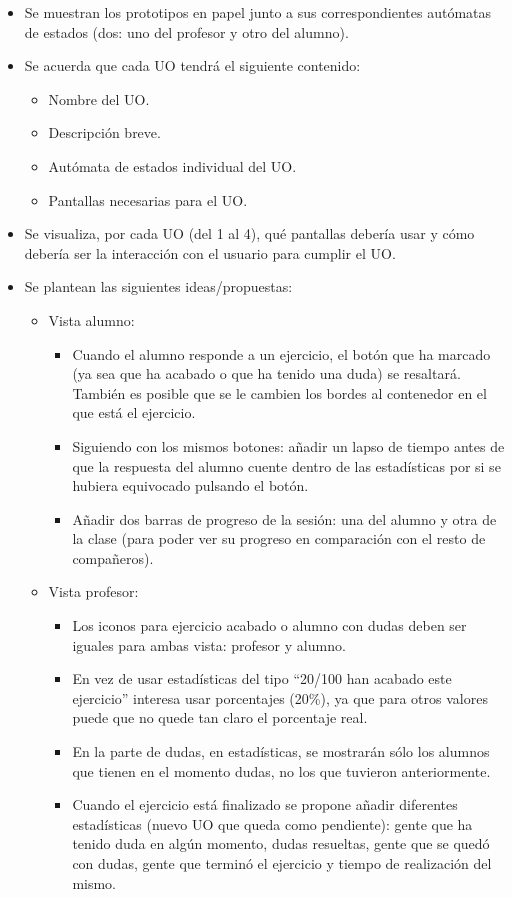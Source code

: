 \begin{itemize}
\item Se muestran los prototipos en papel junto a sus correspondientes autómatas de estados (dos: uno del profesor y otro del alumno).

\item Se acuerda que cada UO tendrá el siguiente contenido:
\begin{itemize}
	\item Nombre del UO.
	\item Descripción breve.
	\item Autómata de estados individual del UO.
	\item Pantallas necesarias para el UO.
\end{itemize}

\item Se visualiza, por cada UO (del 1 al 4), qué pantallas debería usar y cómo debería ser la interacción con el usuario para cumplir el UO. 

\item Se plantean las siguientes ideas/propuestas:
\begin{itemize}
	\item Vista alumno:
	\begin{itemize}
		\item Cuando el alumno responde a un ejercicio, el botón que ha marcado (ya sea que ha acabado o que ha tenido una 		duda) se resaltará. También es posible que se le cambien los bordes al contenedor en el que está el ejercicio.
		\item Siguiendo con los mismos botones: añadir un lapso de tiempo antes de que la respuesta del alumno cuente 				dentro de las estadísticas por si se hubiera equivocado pulsando el botón.
		\item Añadir dos barras de progreso de la sesión: una del alumno y otra de la clase (para poder ver su progreso en 		comparación con el resto de compañeros).
	\end{itemize}
	\item Vista profesor:
	\begin{itemize}
		\item Los iconos para ejercicio acabado o alumno con dudas deben ser iguales para ambas vista: profesor y alumno.
		\item En vez de usar estadísticas del tipo “20/100 han acabado este ejercicio” interesa usar porcentajes (20\%), 			ya que para otros valores puede que no quede tan claro el porcentaje real. 
		\item En la parte de dudas, en estadísticas, se mostrarán sólo los alumnos que tienen en el momento dudas, no los 			que tuvieron anteriormente.
		\item Cuando el ejercicio está finalizado se propone añadir diferentes estadísticas (nuevo UO que queda como 				pendiente): gente que ha tenido duda en algún momento, dudas resueltas, gente que se quedó con dudas, gente que 			terminó el ejercicio y tiempo de realización del mismo.
	\end{itemize}
\end{itemize}


\end{itemize}
